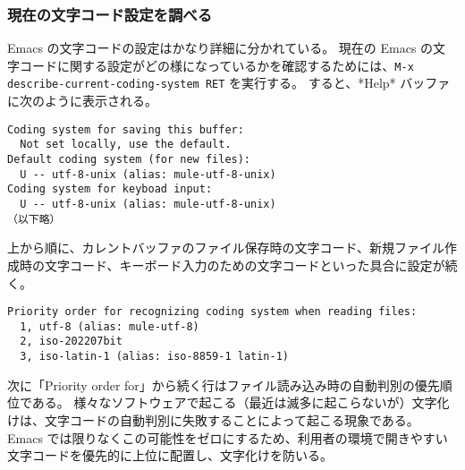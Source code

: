 \subsubsection{現在の文字コード設定を調べる}
Emacs の文字コードの設定はかなり詳細に分かれている。
現在の Emacs の文字コードに関する設定がどの様になっているかを確認するためには、\texttt{M-x describe-current-coding-system RET} を実行する。
すると、*Help* バッファに次のように表示される。
\begin{mdframed}[roundcorner=0.50zw,leftmargin=3.00zw,rightmargin=3.00zw,skipabove=0.40zw,skipbelow=0.40zw,innertopmargin=4.00pt,innerbottommargin=4.00pt,innerleftmargin=5.00pt,innerrightmargin=5.00pt,linecolor=gray!090,linewidth=0.50pt,backgroundcolor=gray!90]\color{gray!10}
\begin{verbatim}
Coding system for saving this buffer:
  Not set locally, use the default.
Default coding system (for new files):
  U -- utf-8-unix (alias: mule-utf-8-unix)
Coding system for keyboad input:
  U -- utf-8-unix (alias: mule-utf-8-unix)
（以下略）
\end{verbatim}
\end{mdframed}
上から順に、カレントバッファのファイル保存時の文字コード、新規ファイル作成時の文字コード、キーボード入力のための文字コードといった具合に設定が続く。
\begin{mdframed}[roundcorner=0.50zw,leftmargin=3.00zw,rightmargin=3.00zw,skipabove=0.40zw,skipbelow=0.40zw,innertopmargin=4.00pt,innerbottommargin=4.00pt,innerleftmargin=5.00pt,innerrightmargin=5.00pt,linecolor=gray!090,linewidth=0.50pt,backgroundcolor=gray!90]\color{gray!10}
\begin{verbatim}
Priority order for recognizing coding system when reading files:
  1, utf-8 (alias: mule-utf-8)
  2, iso-202207bit
  3, iso-latin-1 (alias: iso-8859-1 latin-1)
\end{verbatim}
\end{mdframed}
次に「Priority order for」から続く行はファイル読み込み時の自動判別の優先順位である。
様々なソフトウェアで起こる（最近は滅多に起こらないが）文字化けは、文字コードの自動判別に失敗することによって起こる現象である。\\

Emacs では限りなくこの可能性をゼロにするため、利用者の環境で開きやすい文字コードを優先的に上位に配置し、文字化けを防いる。\\

